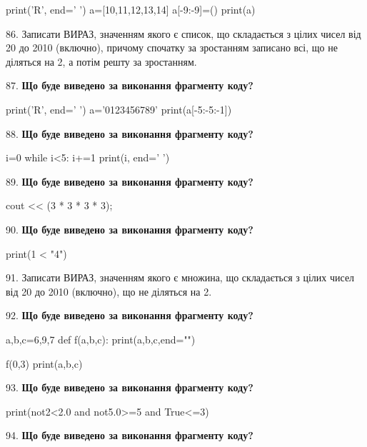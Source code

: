 \documentclass[11pt]{article}
\begin{document}
print('R', end=' ')
a=[10,11,12,13,14]
a[-9:-9]=()
print(a)

\par\vspace{5mm}
86. 
Записати ВИРАЗ, значенням якого є список, що складається з цілих чисел від 20 до 2010 (включно), причому спочатку за зростанням записано всі, що не діляться на 2, а потім решту за зростанням.\par\vspace{5mm}
87. \textbf{Що буде виведено за виконання фрагменту коду?}

print('R', end=' ')
a='0123456789'
print(a[-5:-5:-1])

\par\vspace{5mm}
88. \textbf{Що буде виведено за виконання фрагменту коду?}

i=0
while i<5:
    i+=1
print(i, end=' ')

\par\vspace{5mm}
89. \textbf{Що буде виведено за виконання фрагменту коду?}

cout << (3 * 3 * 3 * 3);
\par\vspace{5mm}
90. \textbf{Що буде виведено за виконання фрагменту коду?}

print(1 < "4")
\par\vspace{5mm}
91. 
Записати ВИРАЗ, значенням якого є множина, що складається з цілих чисел від 20 до 2010 (включно), що не діляться на 2.\par\vspace{5mm}
92. \textbf{Що буде виведено за виконання фрагменту коду?}

a,b,c=6,9,7
def f(a,b,c):
    print(a,b,c,end="")

f(0,3)
print(a,b,c)

\par\vspace{5mm}
93. \textbf{Що буде виведено за виконання фрагменту коду?}

print(not2<2.0 and not5.0>=5 and True<=3)
\par\vspace{5mm}
94. \textbf{Що буде виведено за виконання фрагменту коду?}
\end{document}
